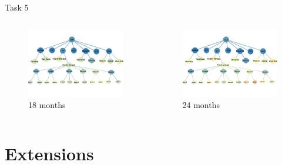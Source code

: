 \documentclass{beamer}
\begin{document}
\begin{frame}{Task 5}
\begin{columns}
\begin{figure}
\centering
\includegraphics[width=\textwidth]{fig/task-5-3.pdf}
\caption{18 months}
\end{figure}
\begin{figure}
\centering
\includegraphics[width=\textwidth]{fig/task-5-4.pdf}
\caption{24 months}
\end{figure}
\end{columns}
\end{frame}

\section{Extensions}
\end{document}
